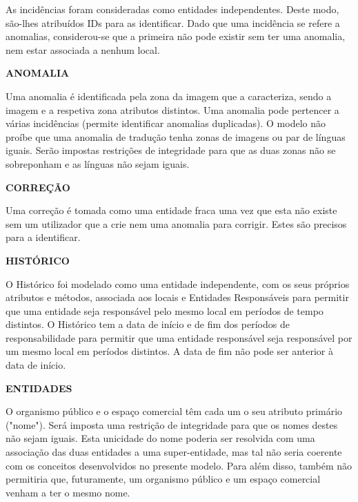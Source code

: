 \documentclass[10pt]{report}
\begin{document}
        As incidências foram consideradas como entidades independentes. Deste modo, são-lhes atribuídos IDs para as identificar.
        Dado que uma incidência se refere a anomalias, considerou-se que a primeira não pode existir sem ter uma anomalia, nem estar associada a nenhum local.
    
    \vspace*{10mm}
    \noindent\textbf{ANOMALIA}

        
        Uma anomalia é identificada pela zona da imagem que a caracteriza, sendo a imagem e a respetiva zona atributos distintos.
        Uma anomalia pode pertencer a várias incidências (permite identificar anomalias duplicadas).
        O modelo não proíbe que uma anomalia de tradução tenha zonas de imagens ou par de línguas iguais. Serão impostas restrições de integridade para que as duas zonas não se sobreponham e as línguas não sejam iguais.
    
    \vspace*{10mm}
    \noindent\textbf{CORREÇÃO}

        
        Uma correção é tomada como uma entidade fraca uma vez que esta não existe sem um utilizador que a crie nem uma anomalia para corrigir. Estes são precisos para a identificar.
    

    \vspace*{10mm}
    \noindent\textbf{HISTÓRICO}

        
        O Histórico foi modelado como uma entidade independente, com os seus próprios atributos e métodos, associada aos locais e Entidades Responsáveis para permitir que uma entidade seja responsável pelo mesmo local em períodos de tempo distintos.
        O Histórico tem a data de início e de fim dos períodos de responsabilidade para permitir que uma entidade responsável seja responsável por um mesmo local em períodos distintos. A data de fim não pode ser anterior à data de início.
    

    \vspace*{10mm}
    \noindent\textbf{ENTIDADES}

        
        O organismo público e o espaço comercial têm cada um o seu atributo primário ("nome"). Será imposta uma restrição de integridade para que os 
        nomes destes não sejam iguais. Esta unicidade do nome poderia ser resolvida com uma associação das duas entidades a uma super-entidade, 
        mas tal não seria coerente com os conceitos desenvolvidos no presente modelo. Para além disso, também não permitiria que, 
        futuramente, um organismo público e um espaço comercial venham a ter o mesmo nome.
    
\end{document}
